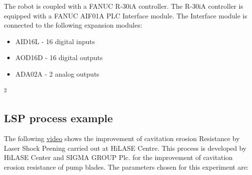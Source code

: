 The robot is coupled with a FANUC R-30iA controller. The R-30iA controller is equipped with a FANUC AIF01A PLC Interface module. The Interface module is connected to the following expansion modules:

\begin{itemize}
    \item AID16L - 16 digital inputs
    \item AOD16D - 16 digital outputs
    \item ADA02A - 2 analog outputs \cite{fanucunitmanual}
\end{itemize}

\textsuperscript{2}

\subsection{LSP process example}

The following \href{https://www.youtube.com/watch?v=awhlLU91-dk&ab_channel=HiLASECentre}{video} shows the improvement of cavitation erosion Resistance by Laser Shock Peening carried out at HiLASE Centre. This process is developed by HiLASE Center and SIGMA GROUP Plc. for the improvement of cavitation erosion resistance of pump blades. The parameters chosen for this experiment are:

